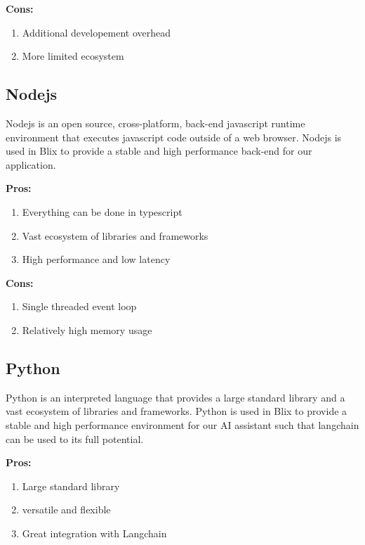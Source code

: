 \documentclass[11pt,a4paper]{article}
\begin{document}
\textbf{Cons:}
\begin{enumerate}[label*=\arabic*.]
	\item[\textbullet] Additional developement overhead
	\item[\textbullet] More limited ecosystem
\end{enumerate}

\subsection{Nodejs}

Nodejs is an open source, cross-platform, back-end javascript runtime environment that
executes javascript code outside of a web browser. Nodejs is used in Blix to provide a
stable and high performance back-end for our application.

\textbf{Pros:}
\begin{enumerate}[label*=\arabic*.]
	\item[\textbullet] Everything can be done in typescript
	\item[\textbullet] Vast ecosystem of libraries and frameworks
	\item[\textbullet] High performance and low latency
\end{enumerate}

\textbf{Cons:}
\begin{enumerate}[label*=\arabic*.]
	\item[\textbullet] Single threaded event loop
	\item[\textbullet] Relatively high memory usage
\end{enumerate}

\subsection{Python}

Python is an interpreted language that provides a large standard library and a vast ecosystem
of libraries and frameworks. Python is used in Blix to provide a stable and high performance
environment for our AI assistant such that langchain can be used to its full potential.

\textbf{Pros:}
\begin{enumerate}[label*=\arabic*.]
    \item [\textbullet] Large standard library
	\item [\textbullet] versatile and flexible
	\item[\textbullet] Great integration with Langchain
\end{enumerate}
\end{document}
